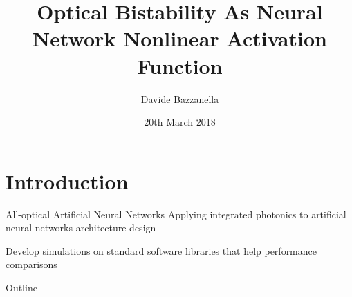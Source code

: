 \documentclass[11pt]{beamer}
\author[D. Bazzanella]{Davide Bazzanella}
\title[All-Optical Neural Networks]{Optical Bistability As Neural Network Nonlinear Activation Function}
\institute[UNITN]{Università degli studi di Trento}
\date{20th March 2018}
\begin{document}
\frame{\titlepage}
\section[Introduction]{Introduction}
\begin{frame}{All-optical Artificial Neural Networks}
	Applying integrated photonics to artificial neural networks architecture design
	
	Develop simulations on standard software libraries that help performance comparisons
\end{frame}

\begin{frame}{Outline}
\tableofcontents[pausesections]
\end{frame}

\end{document}

